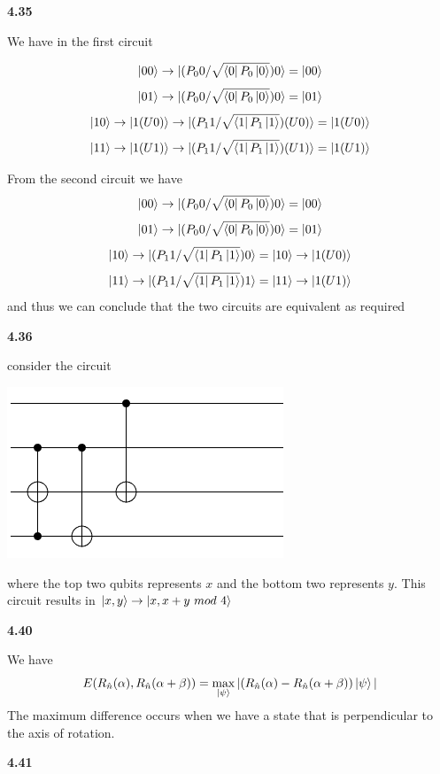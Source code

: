 \textbf{4.35}

We have in the first circuit

\[\ket{00}\rightarrow \ket{(P_00/\sqrt{\bra{0}P_0\ket{0}})0} = \ket{00}\]
\[\ket{01} \rightarrow \ket{(P_00/\sqrt{\bra{0}P_0\ket{0}})0} = \ket{01}\]
\[\ket{10} \rightarrow \ket{1(U0)}\rightarrow \ket{(P_11/\sqrt{\bra{1}P_1\ket{1}})(U0)} = \ket{1(U0)}\]
\[\ket{11} \rightarrow \ket{1(U1)}\rightarrow \ket{(P_11/\sqrt{\bra{1}P_1\ket{1}})(U1)} = \ket{1(U1)}\]

From the second circuit we have 
\[\ket{00}\rightarrow \ket{(P_00/\sqrt{\bra{0}P_0\ket{0}})0} = \ket{00}\]
\[\ket{01} \rightarrow \ket{(P_00/\sqrt{\bra{0}P_0\ket{0}})0} = \ket{01}\]
\[\ket{10} \rightarrow \ket{(P_11/\sqrt{\bra{1}P_1\ket{1}})0} = \ket{10}\rightarrow\ket{1(U0)} \]
\[\ket{11}\rightarrow \ket{(P_11/\sqrt{\bra{1}P_1\ket{1}})1} = \ket{11} \rightarrow \ket{1(U1)}\]
and thus we can conclude that the two circuits are equivalent as required

\textbf{4.36}

consider the circuit

\includegraphics[scale = 0.5]{images/4.36.png}

where the top two qubits represents $x$ and the bottom two represents $y$. This circuit results in $\ket{x,y}\rightarrow \ket{x,x+y \ mod \ 4}$

\textbf{4.40}

We have \[E(R_{\hat{n}}(\alpha),R_{\hat{n}}(\alpha+\beta)) = \max_{\ket{\psi}}|(R_{\hat{n}}(\alpha) - R_{\hat{n}}(\alpha+\beta))\ket{\psi}|\] 
The maximum difference occurs when we have a state that is perpendicular to the axis of rotation. 

\textbf{4.41}

